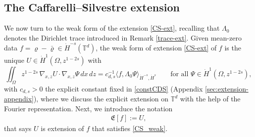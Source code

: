 \documentclass[12pt,a4paper,twoside]{article}
\newcommand{\vr}{\varrho}
\newcommand{\Grad}{\nabla}
\numberwithin{equation}{section}%
\newcommand{\T}{\mathbb{T}}
\begin{document}
	\subsection{The Caffarelli--Silvestre extension}
	\label{sec:extension-trace}
	
We now turn to the weak form of the extension \eqref{CS-ext}, recalling that $\Lambda_0$ denotes the Dirichlet trace introduced in Remark \ref{trace-ext}. Given mean-zero data $f=\vr-\bar\vr\in\dot H^{-s}(\mathbb T^d)$, the weak form of extension \eqref{CS-ext} of $f$ is the unique $U\in\dot H^1(\Omega,z^{1-2s})$ with
	\begin{equation}\label{CS_weak}
		\iint_{\Omega} z^{1-2s}\,\Grad_{x,z} U\cdot\Grad_{x,z}\Psi\,dx\,dz
		= c_{d,s}^{-1}\big\langle f,\Lambda_0\Psi\big\rangle_{\dot H^{-s},\dot H^{s}}
		\qquad\text{for all }\Psi\in\dot H^1(\Omega,z^{1-2s}),
	\end{equation}
	with $c_{d,s}>0$ the explicit constant fixed in \eqref{constCDS} (Appendix \ref{sec:extension-appendix}), where we discuss the explicit extension on $\T^d$ with the help of the Fourier representation. Next, we introduce the notation 
	\begin{align}\label{Not:CSext}
			\mathfrak E[f]:=U,
	\end{align}
	that says $U$ is extension of $f$ that satisfies \eqref{CS_weak}. 
	
\end{document}
